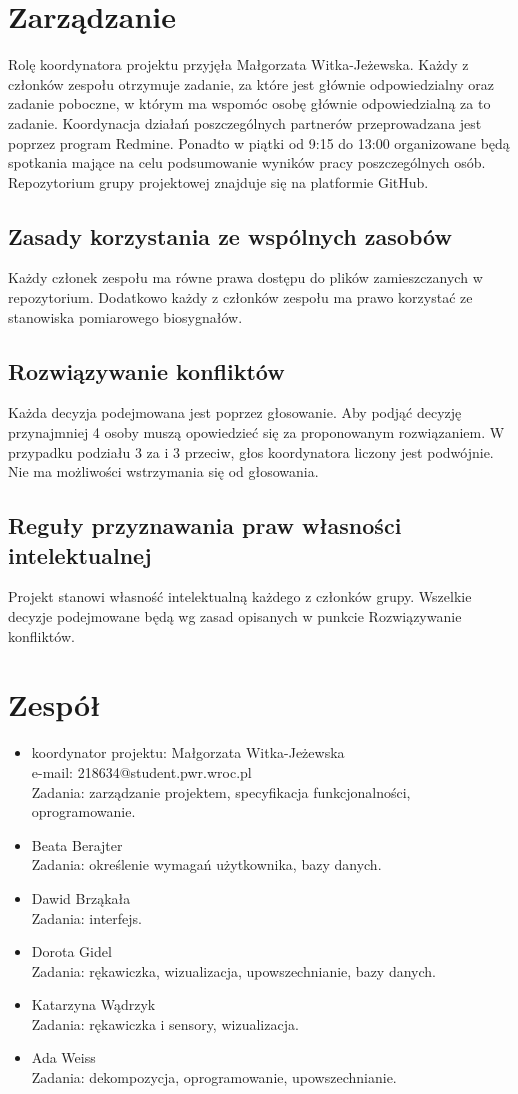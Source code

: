 \documentclass{article}
\begin{document}
\section{Zarządzanie}
Rolę koordynatora projektu przyjęła Małgorzata Witka-Jeżewska. Każdy z członków zespołu otrzymuje zadanie, za które jest głównie odpowiedzialny oraz zadanie poboczne, w którym ma wspomóc osobę głównie odpowiedzialną za to zadanie. Koordynacja działań poszczególnych partnerów przeprowadzana jest poprzez program Redmine. Ponadto w piątki od 9:15 do 13:00 organizowane będą spotkania mające na celu podsumowanie wyników pracy poszczególnych osób. Repozytorium grupy projektowej znajduje się na platformie GitHub.
\subsection{Zasady korzystania ze wspólnych zasobów}
Każdy członek zespołu ma równe prawa dostępu do plików zamieszczanych w repozytorium. Dodatkowo każdy z członków zespołu ma prawo korzystać ze stanowiska pomiarowego biosygnałów.
\subsection{Rozwiązywanie konfliktów}
Każda decyzja podejmowana jest poprzez głosowanie. Aby podjąć decyzję przynajmniej 4 osoby muszą opowiedzieć się za proponowanym rozwiązaniem. W przypadku podziału 3 za i 3 przeciw, głos koordynatora liczony jest podwójnie. Nie ma możliwości wstrzymania się od głosowania.
\subsection{Reguły przyznawania praw własności intelektualnej}
Projekt stanowi własność intelektualną każdego z członków grupy. Wszelkie decyzje podejmowane będą wg zasad opisanych w punkcie Rozwiązywanie konfliktów.
\section{Zespół}
\begin{itemize}
\item koordynator projektu: Małgorzata Witka-Jeżewska\\e-mail: 218634@student.pwr.wroc.pl\\
Zadania: zarządzanie projektem, specyfikacja funkcjonalności, oprogramowanie.
\item Beata Berajter \\
Zadania: określenie wymagań użytkownika, bazy danych.
\item Dawid Brząkała \\
Zadania: interfejs.
\item Dorota Gidel \\
Zadania: rękawiczka, wizualizacja, upowszechnianie, bazy danych.
\item Katarzyna Wądrzyk \\
Zadania: rękawiczka i sensory, wizualizacja.
\item Ada Weiss \\
Zadania: dekompozycja, oprogramowanie, upowszechnianie.
\end{itemize}
\end{document}

